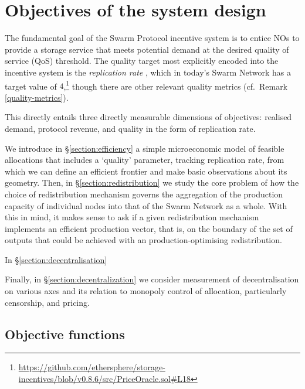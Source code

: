 
\section{Objectives of the system design}
\label{section:objectives}

The fundamental goal of the Swarm Protocol incentive system is to entice NOs to provide a storage service that meets potential demand at the desired quality of service (QoS) threshold.
%
The quality target most explicitly encoded into the incentive system is the \emph{replication rate} \cite[\S3.4.5]{book-of-swarm}, which in today's Swarm Network has a target value of $4$,\footnote{\url{https://github.com/ethersphere/storage-incentives/blob/v0.8.6/src/PriceOracle.sol\#L18}} though there are other relevant quality metrics (cf.~Remark \ref{quality-metrics}).

This directly entails three directly measurable dimensions of objectives: realised demand, protocol revenue, and quality in the form of replication rate.

We introduce in \S\ref{section:efficiency} a simple microeconomic model of feasible allocations that includes a `quality' parameter, tracking replication rate, from which we can define an efficient frontier and make basic observations about its geometry.
%
Then, in \S\ref{section:redistribution} we study the core problem of how the choice of redistribution mechanism governs the aggregation of the production capacity of individual nodes into that of the Swarm Network as a whole.
%
With this in mind, it makes sense to ask if a given redistribution mechanism implements an efficient production vector, that is, on the boundary of the set of outputs that could be achieved with an production-optimising redistribution.

In \S\ref{section:decentralisation}


Finally, in \S\ref{section:decentralization} we consider measurement of decentralisation on various axes and its relation to monopoly control of allocation, particularly censorship, and pricing.

\subsection{Objective functions}

